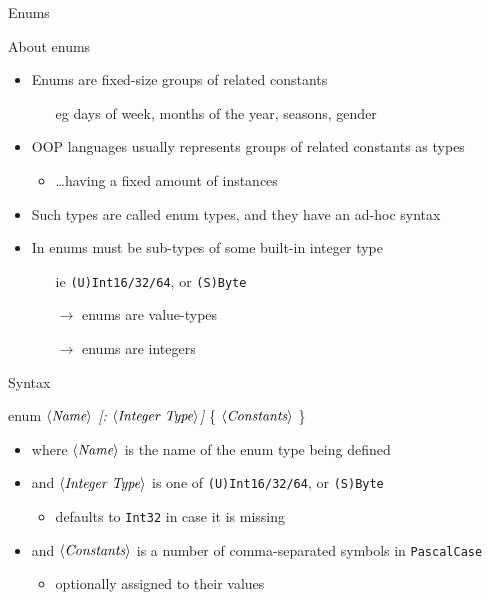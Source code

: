 \documentclass[presentation]{beamer}
\newcommand{\cscat}[1]{$\langle\text{{\itshape#1}}\rangle$}
\newcommand{\csopt}[1]{{\itshape[#1]}}
\begin{document}
\begin{frame}[allowframebreaks]{Enums}
  \begin{block}{About enums}
    \begin{itemize}
      \item Enums are fixed-size groups of related constants
      \begin{itemize}
        \item[eg] days of week, months of the year, seasons, gender  
      \end{itemize}

      \item OOP languages usually represents groups of related constants as types
      \begin{itemize}
        \item \ldots having a fixed amount of instances
      \end{itemize}

      \item Such types are called \alert{enum} types, and they have an ad-hoc syntax

      \item In \dotnet{} enums must be sub-types of some built-in integer type
      \begin{itemize}
        \item[ie] \texttt{(U)Int16/32/64}, or \texttt{(S)Byte}
        \item[$\rightarrow$] \dotnet enums are value-types
        \item[$\rightarrow$] \dotnet enums are integers 
      \end{itemize}
    \end{itemize}
  \end{block}

  \begin{block}{Syntax}
    \begin{center}\ttfamily
      enum \cscat{Name} \csopt{: \cscat{Integer Type}} \{ \cscat{Constants} \}
    \end{center}
    \begin{itemize}
      \item where \texttt{\cscat{Name}} is the name of the enum type being defined
      \item and \texttt{\cscat{Integer Type}} is one of \texttt{(U)Int16/32/64}, or \texttt{(S)Byte}
      \begin{itemize}
        \item defaults to \texttt{Int32} in case it is missing
      \end{itemize}
      \item and \cscat{Constants} is a number of comma-separated symbols in \texttt{PascalCase}
      \begin{itemize}
        \item optionally assigned to their values
      \end{itemize}
    \end{itemize}
  \end{block}


\end{frame}
\end{document}
